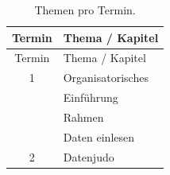 \documentclass[12pt,ngerman,]{book}
\begin{document}
\begin{longtable}[]{@{}cl@{}}
\caption{\label{tab:Themen} Themen pro Termin.}\tabularnewline
\toprule
\begin{minipage}[b]{0.12\columnwidth}\centering\strut
Termin\strut
\end{minipage} & \begin{minipage}[b]{0.50\columnwidth}\raggedright\strut
Thema / Kapitel\strut
\end{minipage}\tabularnewline
\midrule
\endfirsthead
\toprule
\begin{minipage}[b]{0.12\columnwidth}\centering\strut
Termin\strut
\end{minipage} & \begin{minipage}[b]{0.50\columnwidth}\raggedright\strut
Thema / Kapitel\strut
\end{minipage}\tabularnewline
\midrule
\endhead
\begin{minipage}[t]{0.12\columnwidth}\centering\strut
1\strut
\end{minipage} & \begin{minipage}[t]{0.50\columnwidth}\raggedright\strut
Organisatorisches\strut
\end{minipage}\tabularnewline
\begin{minipage}[t]{0.48\columnwidth}\centering\strut
\strut
\end{minipage} & \begin{minipage}[t]{0.48\columnwidth}\raggedright\strut
Einführung\strut
\end{minipage}\tabularnewline
\begin{minipage}[t]{0.48\columnwidth}\centering\strut
\strut
\end{minipage} & \begin{minipage}[t]{0.48\columnwidth}\raggedright\strut
Rahmen\strut
\end{minipage}\tabularnewline
\begin{minipage}[t]{0.48\columnwidth}\centering\strut
\strut
\end{minipage} & \begin{minipage}[t]{0.48\columnwidth}\raggedright\strut
Daten einlesen\strut
\end{minipage}\tabularnewline
\begin{minipage}[t]{0.12\columnwidth}\centering\strut
2\strut
\end{minipage} & \begin{minipage}[t]{0.50\columnwidth}\raggedright\strut
Datenjudo\strut
\end{minipage}\tabularnewline

\end{longtable}
\end{document}
